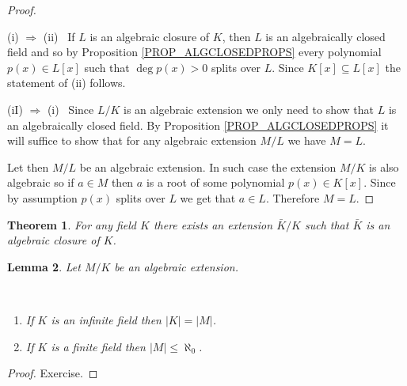\documentclass[12pt, letterpaper, oneside]{article}
\theoremstyle{plain}
\newtheorem{theorem}{Theorem}[section]
\newtheorem{lemma}[theorem]{Lemma}
\theoremstyle{definition}
\newcommand{\benu}{\begin{enumerate}}
\newcommand{\eenu}{\end{enumerate}}
\newcommand{\vs}{\vskip 5mm}
\newcommand{\isep}[1][0]{\setlength{\itemsep}{#1 mm}}
\begin{document}
\vs

\begin{proof} \ 

(i) $\Rightarrow$ (ii) \  If $L$ is an algebraic closure of $K$, then $L$ is an algebraically closed 
field and so by Proposition \ref{PROP_ALGCLOSEDPROPS} every polynomial $p(x)\in L[x]$
such that $\deg p(x)>0$ splits over $L$. Since $K[x] \subseteq L[x]$ the statement of (ii)
follows. 

\vs

(iI) $\Rightarrow$ (i) \ Since $L/K$ is an algebraic extension we only need  to show that 
$L$ is an algebraically closed field. 
By Proposition  \ref{PROP_ALGCLOSEDPROPS} it will suffice to show that 
for any algebraic extension $M/L$ we have $M=L$. 
 
Let then $M/L$ be an algebraic extension. In such case the extension $M/K$ is also algebraic 
so if  $a\in M$ then  $a$ is a root  of some polynomial $p(x)\in K[x]$. Since by assumption $p(x)$ 
splits over $L$ we get that $a\in L$.  Therefore $M = L$. 
 
\end{proof}



\vs\vs


\begin{theorem}
\label{THM_ALGCLEXISTS}
For any field $K$ there exists an extension $\bar{K}/K$ such that $\bar{K}$ is an algebraic closure of 
$K$. 
\end{theorem}


\vs\vs


\begin{lemma}
\label{LEMMA_ALGEXTCARD}
Let  $M/K$ be an algebraic extension. 

\vskip -13mm

\ 
\benu
\isep[0]
\item If $K$ is an infinite field then $|K| = |M|$. 
\item If $K$ is a finite field then $|M| \leq \aleph_{0}$.
\eenu
\end{lemma}


\vs\vs

\begin{proof}
Exercise. 
\end{proof}

\vs\vs
\end{document}

